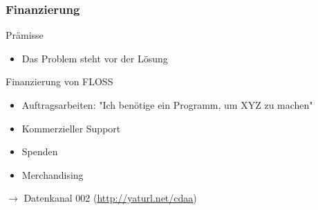 \documentclass[compress]{beamer}
\begin{document}
\begin{frame}
	\frametitle{Finanzierung}
	\begin{block}{Prämisse}
		\begin{itemize}
			\item Das Problem steht vor der Lösung
		\end{itemize}
	\end{block}
	\pause
	\begin{block}{Finanzierung von FLOSS}
		\begin{itemize}
			\item Auftragsarbeiten: "Ich benötige ein Programm, um XYZ zu machen"
			\item Kommerzieller Support
			\item Spenden
			\item Merchandising 
		\end{itemize}
	\end{block}
	\pause
	$\rightarrow$ Datenkanal 002 (\url{http://yaturl.net/cdaa})
\end{frame}
\end{document}
